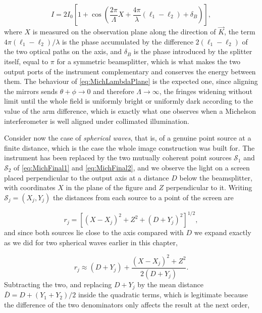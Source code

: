         \begin{equation}\label{eq:MichIPlane}
            I = 2I_0\left[1+\cos\left(\frac{2\pi}{\Lambda}X + \frac{4\pi}{\lambda}\left(\ell_1-\ell_2\right) + \delta_B\right)\right],
        \end{equation}
        where $X$ is measured on the observation plane along the direction of $\vec{K}$, the term $4\pi(\ell_1-\ell_2)/\lambda$ is the phase accumulated by the difference $2(\ell_1-\ell_2)$ of the two optical paths on the axis, and $\delta_B$ is the phase introduced by the splitter itself, equal to $\pi$ for a symmetric beamsplitter, which is what makes the two output ports of the instrument complementary and conserves the energy between them. The behaviour of \ref{eq:MichLambdaPlane} is the expected one, since aligning the mirrors sends $\theta+\phi \to 0$ and therefore $\Lambda \to \infty$, the fringes widening without limit until the whole field is uniformly bright or uniformly dark according to the value of the arm difference, which is exactly what one observes when a Michelson interferometer is well aligned under collimated illumination.

        Consider now the case of \emph{spherical waves}, that is, of a genuine point source at a finite distance, which is the case the whole image construction was built for. The instrument has been replaced by the two mutually coherent point sources $\mathcal{S}_1$ and $\mathcal{S}_2$ of \ref{eq:MichFinal1} and \ref{eq:MichFinal2}, and we observe the light on a screen placed perpendicular to the output axis at a distance $D$ below the beamsplitter, with coordinates $X$ in the plane of the figure and $Z$ perpendicular to it. Writing $\mathcal{S}_j = (X_j, Y_j)$ the distances from each source to a point of the screen are

        \begin{equation*}
            r_j = \left[\left(X-X_j\right)^{2} + Z^{2} + \left(D+Y_j\right)^{2}\right]^{1/2},
        \end{equation*}
        and since both sources lie close to the axis compared with $D$ we expand exactly as we did for two spherical waves earlier in this chapter,

        \begin{equation*}
            r_j \approx \left(D+Y_j\right) + \frac{\left(X-X_j\right)^{2}+Z^{2}}{2\left(D+Y_j\right)} .
        \end{equation*}
        Subtracting the two, and replacing $D+Y_j$ by the mean distance $\bar{D} = D + (Y_1+Y_2)/2$ inside the quadratic terms, which is legitimate because the difference of the two denominators only affects the result at the next order,

